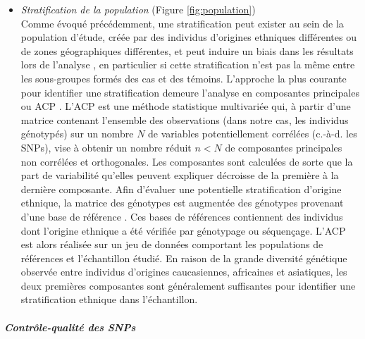 \documentclass[11pt,a4paper,notrimn]{krantz}
\providecommand{\tightlist}{%
  \setlength{\itemsep}{0pt}\setlength{\parskip}{0pt}}
\let\oldsubparagraph\subparagraph
\renewcommand{\subparagraph}[1]{\oldsubparagraph{#1}\mbox{}}
\theoremstyle{definition}
\theoremstyle{definition}
\theoremstyle{remark}
\begin{document}
\begin{itemize}
\tightlist
\item
  \emph{Stratification de la population} (Figure \ref{fig:population})\\
  Comme évoqué précédemment, une stratification peut exister au sein de
  la population d'étude, créée par des individus d'origines ethniques
  différentes ou de zones géographiques différentes, et peut induire un
  biais dans les résultats lors de l'analyse
  \citep{clayton_population_2005, cardon_population_2003}, en
  particulier si cette stratification n'est pas la même entre les
  sous-groupes formés des cas et des témoins. L'approche la plus
  courante pour identifier une stratification demeure l'analyse en
  composantes principales ou ACP
  \citep{caussinus_models_1986, patterson_population_2006, price_principal_2006}.
  L'ACP est une méthode statistique multivariée qui, à partir d'une
  matrice contenant l'ensemble des observations (dans notre cas, les
  individus génotypés) sur un nombre \(N\) de variables potentiellement
  corrélées (c.-à-d. les SNPs), vise à obtenir un nombre réduit \(n<N\)
  de composantes principales non corrélées et orthogonales. Les
  composantes sont calculées de sorte que la part de variabilité
  qu'elles peuvent expliquer décroisse de la première à la dernière
  composante. Afin d'évaluer une potentielle stratification d'origine
  ethnique, la matrice des génotypes est augmentée des génotypes
  provenant d'une base de référence
  \citep{gibbs_international_2003, siva_1000_2008, the_1000_genomes_project_consortium_global_2015}.
  Ces bases de références contiennent des individus dont l'origine
  ethnique a été vérifiée par génotypage ou séquençage. L'ACP est alors
  réalisée sur un jeu de données comportant les populations de
  références et l'échantillon étudié. En raison de la grande diversité
  génétique observée entre individus d'origines caucasiennes, africaines
  et asiatiques, les deux premières composantes sont généralement
  suffisantes pour identifier une stratification ethnique dans
  l'échantillon.
\end{itemize}

\clearpage

\subparagraph{Contrôle-qualité des
SNPs}\label{controle-qualite-des-snps}
\end{document}
